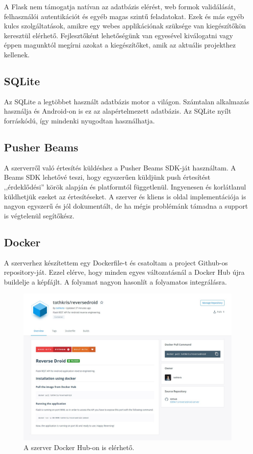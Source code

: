 \documentclass{thesis-ekf}
\theoremstyle{definition}
\theoremstyle{remark}
\begin{document}
A Flask nem támogatja natívan az adatbázis elérést, web formok validálását, felhasználói autentikációt és egyéb magas szintű feladatokat.
Ezek és más egyéb kulcs szolgáltatások, amikre egy webes applikációnak szüksége van kiegészítőkön keresztül elérhető.
Fejlesztőként lehetőségünk van egyesével kiválogatni vagy éppen magunktól megírni azokat a kiegészítőket, amik az aktuális projekthez kellenek.
\cite{flask}

\subsection{SQLite}

Az SQLite a legtöbbet használt adatbázis motor a világon. 
Számtalan alkalmazás használja és Android-on is ez az alapértelmezett adatbázis.
Az SQLite nyílt forráskódú, így mindenki nyugodtan használhatja.

\subsection{Pusher Beams}

A szerverről való értesítés küldéshez a Pusher Beams SDK-ját használtam.
A Beams SDK lehetővé teszi, hogy egyszerűen küldjünk push értesítést ,,érdeklődési'' körök alapján és platformtól függetlenül.
Ingyenesen és korlátlanul küldhetjük ezeket az értesítéseket.
A szerver és kliens is oldal implementációja is nagyon egyszerű és jól dokumentált, de ha mégis problémánk támadna a support is  végtelenül segítőkész.


\subsection{Docker}\label{docker}

A szerverhez készítettem egy Dockerfile-t és csatoltam a project Github-os repository-ját.
Ezzel elérve, hogy minden egyes változatásnál a Docker Hub újra buildelje a képfájlt.
A folyamat nagyon hasonlít a folyamatos integrálásra.

\begin{figure}[!h]
	\centering
	\includegraphics[width=15cm]{pictures/docker_hub}
	\caption{A szerver Docker Hub-on is elérhető.}
	\label{dockerhub}
\end{figure}
\end{document}
